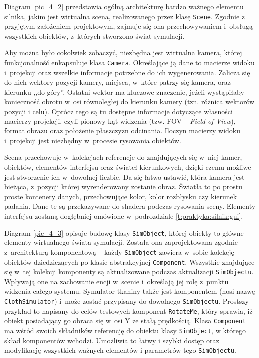 		
		
		Diagram \ref{pic_4_2} przedstawia ogólną architekturę bardzo ważnego elementu silnika, jakim jest wirtualna scena, realizowanego przez klasę \texttt{Scene}. Zgodnie z przyjętym założeniem projektowym, zajmuje się ona przechowywaniem i~obsługą wszystkich obiektów, z~których stworzono świat symulacji. 
		
		Aby można było cokolwiek zobaczyć, niezbędna jest wirtualna kamera, której funkcjonalność enkapsuluje klasa \texttt{Camera}. Określające ją dane to macierze widoku i~projekcji oraz wszelkie informacje potrzebne do ich wygenerowania. Zalicza się do nich wektory pozycji kamery, miejsca, w~które patrzy się kamera, oraz kierunku ,,do góry''. Ostatni wektor ma kluczowe znaczenie, jeżeli wystąpiłaby konieczność obrotu w~osi równoległej do kierunku kamery (tzn. różnica wektorów pozycji i celu). Oprócz tego są tu dostępne informacje dotyczące własności macierzy projekcji, czyli pionowy kąt widzenia (tzw. FOV -- \emph{Field of View}), format obrazu oraz położenie płaszczyzn odcinania. Iloczyn macierzy widoku i~projekcji jest niezbędny w~procesie rysowania obiektów.
		
		Scena przechowuje w~kolekcjach referencje do znajdujących się w~niej kamer, obiektów, elementów interfejsu oraz świateł kierunkowych, dzięki czemu możliwe jest stworzenie ich w~dowolnej liczbie. Da się łatwo ustawić, która kamera jest bieżąca, z~pozycji której wyrenderowany zostanie obraz. Światła to po prostu proste kontenery danych, przechowujące kolor, kolor rozbłysku czy kierunek padania. Dane te są przekazywane do shadera podczas rysowania sceny. Elementy interfejsu zostaną dogłębniej omówione w~podrozdziale \ref{t:praktyka:silnik:gui}.
		
		
		Diagram \ref{pic_4_3} opisuje budowę klasy \texttt{SimObject}, której obiekty to główne elementy wirtualnego świata symulacji. Została ona zaprojektowana zgodnie z~architekturą komponentową -- każdy \texttt{SimObject} zawiera w~sobie kolekcję obiektów dziedziczących po klasie abstrakcyjnej \texttt{Component}. Wszystkie znajdujące się w~tej kolekcji komponenty są aktualizowane podczas aktualizacji \texttt{SimObjectu}. Wpływają one na zachowanie encji w~scenie i~określają jej rolę z~punktu widzenia całego systemu. Symulator tkaniny także jest komponentem (nosi nazwę \texttt{ClothSimulator}) i~może zostać przypisany do dowolnego \texttt{SimObjectu}. Prostszy przykład to napisany do celów testowych komponent \texttt{RotateMe}, który sprawia, iż obiekt posiadający go obraca się w~osi Y ze stałą prędkością. Klasa \texttt{Component} ma wśród swoich składników referencję do obiektu klasy \texttt{SimObject}, w którego skład komponentów wchodzi. Umożliwia to łatwy i szybki dostęp oraz modyfikację wszystkich ważnych elementów i parametrów tego \texttt{SimObjectu}.
		
